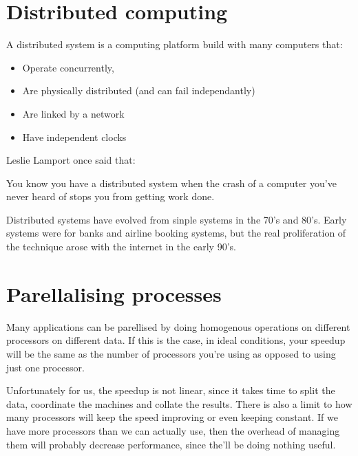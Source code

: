 
\section{Distributed computing}

A distributed system is a computing platform build with many computers that:

\begin{itemize}
  \item Operate concurrently,
  \item Are physically distributed (and can fail independantly)
  \item Are linked by a network
  \item Have independent clocks
\end{itemize}

Leslie Lamport once said that:


You know you have a distributed system when the crash of a computer you've never
heard of stops you from getting work done.

Distributed systems have evolved from sinple systems in the 70's and 80's. Early
systems were for banks and airline booking systems, but the real proliferation
of the technique arose with the internet in the early 90's.



 \section{Parellalising processes}

Many applications can be parellised by doing homogenous operations on different
processors on different data. If this is the case, in ideal conditions, your
speedup will be the same as the number of processors you're using as opposed to
using just one processor.

Unfortunately for us, the speedup is not linear, since it takes time to split
the data, coordinate the machines and collate the results. There is also a limit
to how many processors will keep the speed improving or even keeping constant.
If we have more processors than we can actually use, then the overhead of
managing them will probably decrease performance, since the'll be doing nothing
useful.
